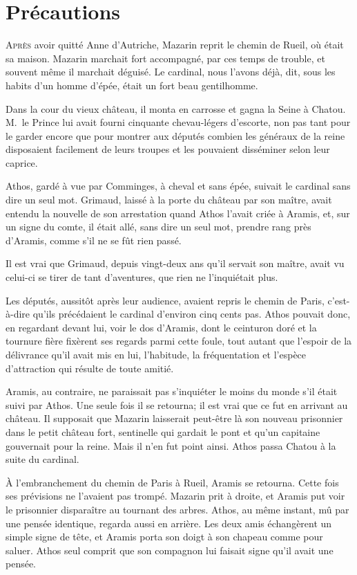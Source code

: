 \chapter{Précautions}

\lettrine{A}{près} avoir quitté Anne d'Autriche, Mazarin reprit le chemin de Rueil, où était sa maison. Mazarin marchait fort accompagné, par ces temps de trouble, et souvent même il marchait déguisé. Le cardinal, nous l'avons déjà, dit, sous les habits d'un homme d'épée, était un fort beau gentilhomme.

Dans la cour du vieux château, il monta en carrosse et gagna la Seine à Chatou. M.~le Prince lui avait fourni cinquante chevau-légers d'escorte, non pas tant pour le garder encore que pour montrer aux députés combien les généraux de la reine disposaient facilement de leurs troupes et les pouvaient disséminer selon leur caprice.

Athos, gardé à vue par Comminges, à cheval et sans épée, suivait le cardinal sans dire un seul mot. Grimaud, laissé à la porte du château par son maître, avait entendu la nouvelle de son arrestation quand Athos l'avait criée à Aramis, et, sur un signe du comte, il était allé, sans dire un seul mot, prendre rang près d'Aramis, comme s'il ne se fût rien passé.

Il est vrai que Grimaud, depuis vingt-deux ans qu'il servait son maître, avait vu celui-ci se tirer de tant d'aventures, que rien ne l'inquiétait plus.

Les députés, aussitôt après leur audience, avaient repris le chemin de Paris, c'est-à-dire qu'ils précédaient le cardinal d'environ cinq cents pas. Athos pouvait donc, en regardant devant lui, voir le dos d'Aramis, dont le ceinturon doré et la tournure fière fixèrent ses regards parmi cette foule, tout autant que l'espoir de la délivrance qu'il avait mis en lui, l'habitude, la fréquentation et l'espèce d'attraction qui résulte de toute amitié.

Aramis, au contraire, ne paraissait pas s'inquiéter le moins du monde s'il était suivi par Athos. Une seule fois il se retourna; il est vrai que ce fut en arrivant au château. Il supposait que Mazarin laisserait peut-être là son nouveau prisonnier dans le petit château fort, sentinelle qui gardait le pont et qu'un capitaine gouvernait pour la reine. Mais il n'en fut point ainsi. Athos passa Chatou à la suite du cardinal.

À l'embranchement du chemin de Paris à Rueil, Aramis se retourna. Cette fois ses prévisions ne l'avaient pas trompé. Mazarin prit à droite, et Aramis put voir le prisonnier disparaître au tournant des arbres. Athos, au même instant, mû par une pensée identique, regarda aussi en arrière. Les deux amis échangèrent un simple signe de tête, et Aramis porta son doigt à son chapeau comme pour saluer. Athos seul comprit que son compagnon lui faisait signe qu'il avait une pensée.

